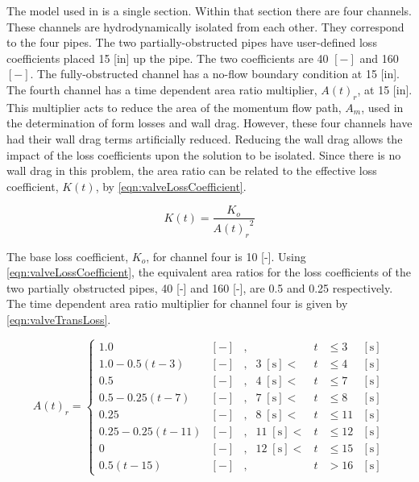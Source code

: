 The model used in \cobra{} is a single section.
Within that section there are four channels.
These channels are hydrodynamically isolated from each other.
They correspond to the four pipes.
The two partially-obstructed pipes have user-defined loss coefficients placed 15 [in] up the pipe.
The two coefficients are 40 $[-]$ and 160 $[-]$.
The fully-obstructed channel has a no-flow boundary condition at 15 [in].
The fourth channel has a time dependent area ratio multiplier, $A(t)_r$, at 15 [in].
This multiplier acts to reduce the area of the momentum flow path, $A_m$, used in the determination of form losses and wall drag.
However, these four channels have had their wall drag terms artificially reduced.
Reducing the wall drag allows the impact of the loss coefficients upon the solution to be isolated.
Since there is no wall drag in this problem, the area ratio can be related to the effective loss coefficient, $K(t)$, by \eqref{eqn:valveLossCoefficient}.

\begin{equation}
\label{eqn:valveLossCoefficient}
K(t) = \frac{K_{o}}{{A(t)_r}^2}
\end{equation}

The base loss coefficient, $K_o$, for channel four is 10 [-].
Using \eqref{eqn:valveLossCoefficient}, the equivalent area ratios for the loss coefficients of the two partially obstructed pipes, 40 [-] and 160 [-], are 0.5 and 0.25 respectively.
The time dependent area ratio multiplier for channel four is given by \eqref{eqn:valveTransLoss}.

\begin{equation}
\label{eqn:valveTransLoss}
A(t)_{r} = \left\{
\begin{array}{cclrcll}
 1.0 & [-] & , & & t & \leq 3 & [\text{s}] \\
 1.0 - 0.5 \left( t - 3\right) & [-] & , & 3\; [\text{s}] < & t & \leq 4 & [\text{s}] \\
 0.5 & [-] & , & 4\; [\text{s}] < & t & \leq 7 & [\text{s}] \\
 0.5 - 0.25 \left( t - 7\right) & [-] & , &  7\; [\text{s}] < & t & \leq 8 & [\text{s}] \\
 0.25 & [-] & , & 8\; [\text{s}] < & t & \leq 11 & [\text{s}] \\
 0.25 - 0.25 \left( t - 11\right) & [-] & , & 11\; [\text{s}] < & t & \leq 12 & [\text{s}] \\
 0 & [-] & , & 12\; [\text{s}] < & t & \leq 15 & [\text{s}] \\
 0.5 \left( t - 15\right) & [-] & , & & t & > 16 & [\text{s}]
\end{array}\right.
\end{equation}

